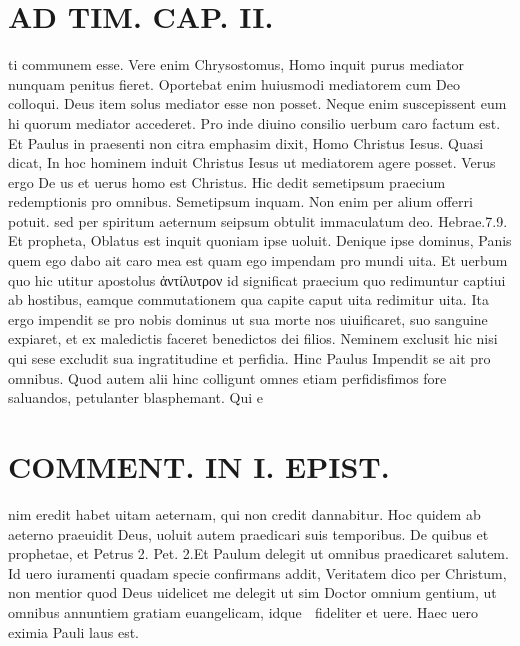 \documentclass{article}
\begin{document}
\begin{pages}
\section*{AD TIM. CAP. II. }
\marginpar{[ p.118 ]}\pstart ti communem esse. Vere enim Chrysostomus, Homo inquit purus mediator nunquam penitus fieret. Oportebat enim huiusmodi mediatorem cum Deo colloqui. Deus item solus mediator esse non posset. Neque enim suscepissent eum hi quorum mediator accederet. Pro inde diuino consilio uerbum caro factum est. Et Paulus in praesenti non citra emphasim dixit, Homo Christus Iesus. Quasi dicat, In hoc hominem induit Christus Iesus ut mediatorem agere posset. Verus ergo De us et uerus homo est Christus. Hic dedit semetipsum praecium redemptionis pro omnibus. Semetipsum inquam. Non enim per alium offerri potuit. sed per spiritum aeternum seipsum obtulit immaculatum deo. Hebrae.7.9. Et propheta, Oblatus est inquit quoniam ipse uoluit. Denique ipse dominus, Panis quem ego dabo ait caro mea est quam ego impendam pro mundi uita. Et uerbum quo hic utitur apostolus ἀντίλυτρον id significat praecium quo redimuntur captiui ab hostibus, eamque commutationem qua capite caput uita redimitur uita. Ita ergo impendit se pro nobis dominus ut sua morte nos uiuificaret, suo sanguine expiaret, et ex maledictis faceret benedictos dei filios. Neminem exclusit hic nisi qui sese excludit sua ingratitudine et perfidia. Hinc Paulus Impendit se ait pro omnibus. Quod autem alii hinc colligunt omnes etiam perfidisfimos fore saluandos, petulanter blasphemant. Qui e\pend
\section*{COMMENT. IN I. EPIST. }\pstart nim eredit habet uitam aeternam, qui non credit dannabitur. Hoc quidem ab aeterno praeuidit Deus, uoluit autem praedicari suis temporibus. De quibus et prophetae, et Petrus 2. Pet. 2.Et Paulum delegit ut omnibus praedicaret salutem. Id uero iuramenti quadam specie confirmans addit, Veritatem dico per Christum, non mentior quod Deus uidelicet me delegit ut sim Doctor omnium gentium, ut omnibus annuntiem gratiam euangelicam, idque  fideliter et uere. Haec uero eximia Pauli laus est.  \pend
{}
{}

\end{pages}
\end{document}

